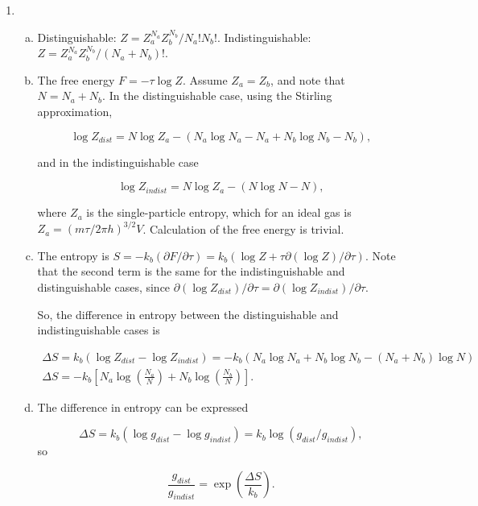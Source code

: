 \documentclass{article}
\begin{document}
\begin{enumerate}
	\item 

	\begin{enumerate}[(a)]

		\item

		Distinguishable: $Z = Z_a^{N_a}Z_b^{N_b} / N_a! N_b!$. Indistinguishable: $Z = Z_a^{N_a}Z_b^{N_b} / (N_a + N_b)!$.

		\item

		The free energy $F = -\tau \log Z$. Assume $Z_a = Z_b$, and note that $N = N_a + N_b$. In the distinguishable case, using the Stirling approximation,

		$$\log Z_{dist} = N \log Z_a - (N_a \log N_a - N_a + N_b \log N_b - N_b),$$

		and in the indistinguishable case

		$$\log Z_{indist} = N \log Z_a - (N \log N - N),$$

		where $Z_a$ is the single-particle entropy, which for an ideal gas is $Z_a = (m \tau / 2 \pi h)^{3/2} V$. Calculation of the free energy is trivial.

		\item

		The entropy is $S = -k_b (\partial F / \partial \tau) = k_b( \log Z + \tau \partial (\log Z) / \partial \tau)$. Note that the second term is the same for the indistinguishable and distinguishable cases, since $\partial (\log Z_{dist}) / \partial \tau = \partial (\log Z_{indist}) / \partial \tau.$

		So, the difference in entropy between the distinguishable and indistinguishable cases is

		\begin{gather*}
		\Delta S = k_b( \log Z_{dist} - \log Z_{indist}) = -k_b (N_a \log N_a + N_b \log N_b - (N_a + N_b) \log N) \\
		\Delta S = -k_b \left[ N_a \log \left( \frac{N_a}{N} \right) + N_b \log \left( \frac{N_b}{N} \right)\right].
		\end{gather*}

		\item

		The difference in entropy can be expressed

		$$\Delta S = k_b (\log g_{dist} - \log g_{indist} ) = k_b\log(g_{dist}/g_{indist}),$$ so

		$$\frac{g_{dist}}{g_{indist}} = \exp \left(\frac{\Delta S}{k_b} \right).$$




\end{enumerate}
\end{enumerate}
\end{document}
